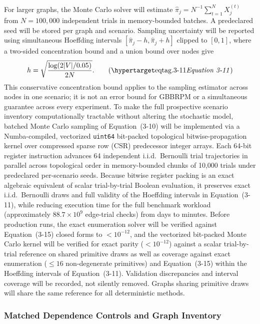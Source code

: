 For larger graphs, the Monte Carlo solver will estimate
$\widehat\pi_j=N^{-1}\sum_{t=1}^{N}X_j^{(t)}$ from $N=100{,}000$
independent trials in memory-bounded batches. A predeclared seed will be
stored per graph and scenario. Sampling uncertainty will be reported using
simultaneous Hoeffding intervals \citep{hoeffding1963} $[\widehat\pi_j-h,\widehat\pi_j+h]$
clipped to $[0,1]$, where a two-sided concentration bound and a union bound over nodes give
\[
h=\sqrt{\frac{\log(2|V|/0.05)}{2N}}.
\eqtag{3-11}
\]
This conservative concentration bound applies to the sampling estimator
across nodes in one scenario; it is not an error bound for GBBRPM or a
simultaneous guarantee across every experiment. To make the full
prospective scenario inventory computationally tractable without altering
the stochastic model, batched Monte Carlo sampling of Equation~(3-10) will
be implemented via a Numba-compiled, vectorized \texttt{uint64} bit-packed
topological bitwise-propagation kernel over compressed sparse row (CSR)
predecessor integer arrays. Each 64-bit register instruction advances 64
independent i.i.d.\ Bernoulli trial trajectories in parallel across
topological order in memory-bounded chunks of 10{,}000 trials under
predeclared per-scenario seeds. Because bitwise register packing is an
exact algebraic equivalent of scalar trial-by-trial Boolean evaluation, it
preserves exact i.i.d.\ Bernoulli draws and full validity of the Hoeffding
intervals in Equation~(3-11), while reducing execution time for the full
benchmark workload (approximately $88.7\times10^9$ edge-trial checks) from
days to minutes. Before production runs, the exact enumeration solver will be verified
against Equation~(3-15) closed forms to $<10^{-12}$, and the vectorized
bit-packed Monte Carlo kernel will be verified for exact parity ($<10^{-12}$)
against a scalar trial-by-trial reference on shared primitive draws as well
as coverage against exact enumeration ($\le16$ non-degenerate primitives)
and Equation~(3-15) within the Hoeffding intervals of Equation~(3-11). Validation discrepancies and
interval coverage will be recorded, not silently removed. Graphs sharing
primitive draws will share the same reference for all deterministic methods.



\subsubsection{Matched Dependence Controls and Graph Inventory}
\label{dependence-controls}

